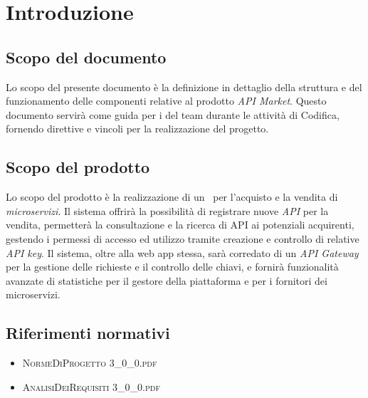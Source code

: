 \newpage
\section{Introduzione}

\subsection{Scopo del documento}
Lo scopo del presente documento è la definizione in dettaglio della struttura e del funzionamento delle componenti relative al prodotto \textit{API Market}. Questo documento servirà come guida per i \textit{\Progrs} del team \textit{\gruppo} durante le attività di Codifica, fornendo direttive e vincoli per la realizzazione del progetto.

\subsection{Scopo del prodotto}
Lo scopo del prodotto è la realizzazione di un \progetto\ per l'acquisto e la vendita di \textit{microservizi}. Il sistema offrirà la possibilità di registrare nuove \textit{API} per la vendita, permetterà la consultazione e la ricerca di API ai potenziali acquirenti, gestendo i permessi di accesso ed utilizzo tramite creazione e controllo di relative \textit{API key}. Il sistema, oltre alla web app stessa, sarà corredato di un \textit{API Gateway} per la gestione delle richieste e il controllo delle chiavi, e fornirà funzionalità avanzate di statistiche per il gestore della piattaforma e per i fornitori dei microservizi.

\subsection{Riferimenti normativi}
\begin{itemize}
	\item \textsc{NormeDiProgetto 3\_0\_0.pdf}
	\item \textsc{AnalisiDeiRequisiti 3\_0\_0.pdf}
\end{itemize}

